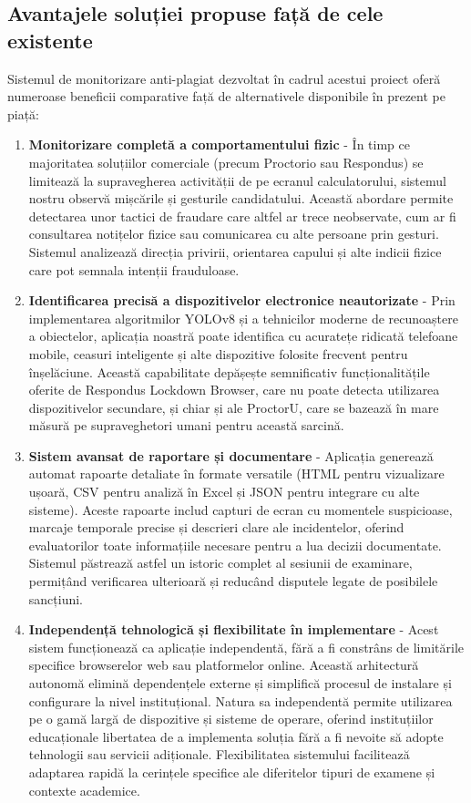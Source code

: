 \documentclass[12pt,a4paper]{article}
\begin{document}
\subsection{Avantajele soluției propuse față de cele existente}

Sistemul de monitorizare anti-plagiat dezvoltat în cadrul acestui proiect oferă numeroase beneficii comparative față de alternativele disponibile în prezent pe piață:

\begin{enumerate}
    \item \textbf{Monitorizare completă a comportamentului fizic} - În timp ce majoritatea soluțiilor comerciale (precum Proctorio sau Respondus) se limitează la supravegherea activității de pe ecranul calculatorului, sistemul nostru observă mișcările și gesturile candidatului. Această abordare permite detectarea unor tactici de fraudare care altfel ar trece neobservate, cum ar fi consultarea notițelor fizice sau comunicarea cu alte persoane prin gesturi. Sistemul analizează direcția privirii, orientarea capului și alte indicii fizice care pot semnala intenții frauduloase.
    
    \item \textbf{Identificarea precisă a dispozitivelor electronice neautorizate} - Prin implementarea algoritmilor YOLOv8 și a tehnicilor moderne de recunoaștere a obiectelor, aplicația noastră poate identifica cu acuratețe ridicată telefoane mobile, ceasuri inteligente și alte dispozitive folosite frecvent pentru înșelăciune. Această capabilitate depășește semnificativ funcționalitățile oferite de Respondus Lockdown Browser, care nu poate detecta utilizarea dispozitivelor secundare, și chiar și ale ProctorU, care se bazează în mare măsură pe supraveghetori umani pentru această sarcină.
    
    \item \textbf{Sistem avansat de raportare și documentare} - Aplicația generează automat rapoarte detaliate în formate versatile (HTML pentru vizualizare ușoară, CSV pentru analiză în Excel și JSON pentru integrare cu alte sisteme). Aceste rapoarte includ capturi de ecran cu momentele suspicioase, marcaje temporale precise și descrieri clare ale incidentelor, oferind evaluatorilor toate informațiile necesare pentru a lua decizii documentate. Sistemul păstrează astfel un istoric complet al sesiunii de examinare, permițând verificarea ulterioară și reducând disputele legate de posibilele sancțiuni.
    
    \item \textbf{Independență tehnologică și flexibilitate în implementare} - Acest sistem funcționează ca aplicație independentă, fără a fi constrâns de limitările specifice browserelor web sau platformelor online. Această arhitectură autonomă elimină dependențele externe și simplifică procesul de instalare și configurare la nivel instituțional. Natura sa independentă permite utilizarea pe o gamă largă de dispozitive și sisteme de operare, oferind instituțiilor educaționale libertatea de a implementa soluția fără a fi nevoite să adopte tehnologii sau servicii adiționale. Flexibilitatea sistemului facilitează adaptarea rapidă la cerințele specifice ale diferitelor tipuri de examene și contexte academice.
    

\end{enumerate}
\end{document}
